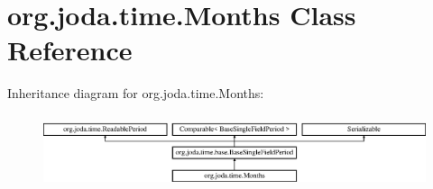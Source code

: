 \hypertarget{classorg_1_1joda_1_1time_1_1_months}{\section{org.\-joda.\-time.\-Months Class Reference}
\label{classorg_1_1joda_1_1time_1_1_months}
}
Inheritance diagram for org.\-joda.\-time.\-Months\-:\begin{figure}[H]
\begin{center}
\leavevmode
\includegraphics[height=2.187500cm]{classorg_1_1joda_1_1time_1_1_months}
\end{center}
\end{figure}
